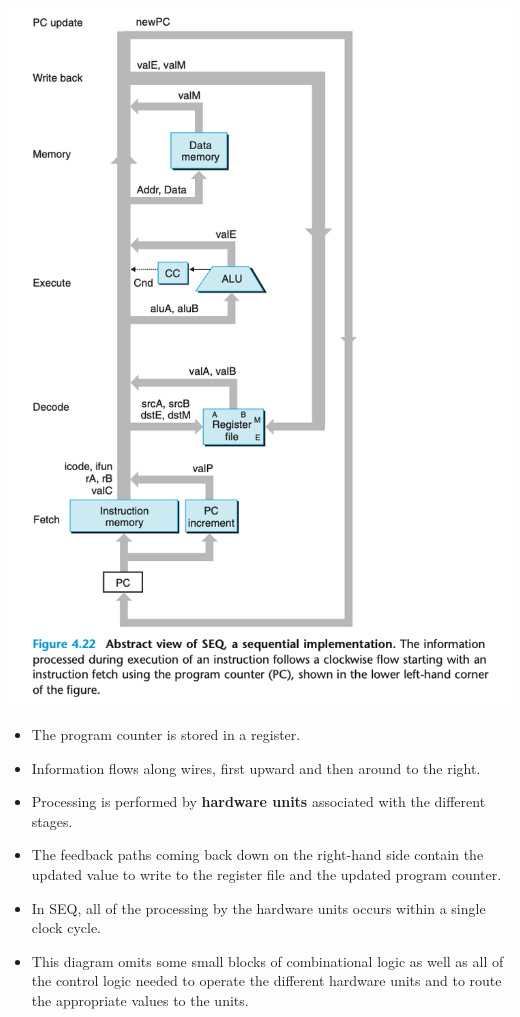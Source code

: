 \documentclass[11pt]{article}
\begin{document}
\begin{center}
\includegraphics[width=.9\linewidth]{pics/figure4.22-abstrct-view-of-seq-a-sequential-implementation.png}
\end{center}

\begin{itemize}
\item The program counter is stored in a register.\\
\item Information flows along wires, first upward and then around to the right.\\
\item Processing is performed by \textbf{hardware units} associated with the different stages.\\
\item The feedback paths coming back down on the right-hand side contain the updated value to write to the register file and the updated program counter.\\
\item In SEQ, all of the processing by the hardware units occurs within a single clock cycle.\\
\item This diagram omits some small blocks of combinational logic as well as all of the control logic needed to operate the different hardware units and to route the appropriate values to the units.\\
\end{itemize}
\end{document}
